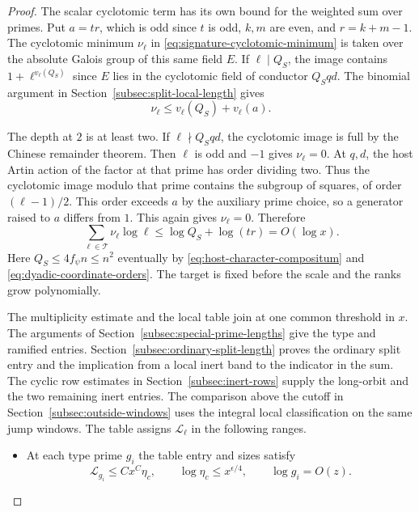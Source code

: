 \begin{proof}
The scalar cyclotomic term has its own bound for the weighted sum over primes.
Put \(a=tr\), which is odd since \(t\) is odd, \(k,m\)
are even, and \(r=k+m-1\). The cyclotomic minimum \(\nu_\ell\) in \eqref{eq:signature-cyclotomic-minimum}
is taken over the absolute Galois group of this same field \(E\). If \(\ell\mid Q_S\), the image
contains \(1+\ell^{v_\ell(Q_S)}\) since \(E\) lies in
the cyclotomic field of conductor \(Q_Sqd\). The
binomial argument in Section~\ref{subsec:split-local-length}
gives
\[
 \nu_\ell\le v_\ell(Q_S)+v_\ell(a).
\]

The depth at \(2\) is at least two. If
\(\ell\nmid Q_Sqd\), the cyclotomic image is full by
the Chinese remainder theorem. Then \(\ell\) is odd
and \(-1\) gives \(\nu_\ell=0\).
At \(q,d\), the host Artin action of the factor at
that prime has order dividing two. Thus the cyclotomic
image modulo that prime contains the subgroup of
squares, of order \((\ell-1)/2\). This order exceeds
\(a\) by the auxiliary prime choice, so a generator raised
to \(a\) differs from \(1\). This again gives
\(\nu_\ell=0\). Therefore
\[
 \sum_{\ell\in\mathcal T}\nu_\ell\log\ell
 \le \log Q_S + \log(tr)=O(\log x).
\]
Here \(Q_S\le4 f_\psi n\le n^2\) eventually by
\eqref{eq:host-character-compositum} and \eqref{eq:dyadic-coordinate-orders}.
The target is fixed before the scale and the ranks grow polynomially.

The multiplicity estimate and the local table join at
one common threshold in \(x\). The arguments of
Section~\ref{subsec:special-prime-lengths}
give the type and ramified entries. Section~\ref{subsec:ordinary-split-length}
proves the ordinary split entry and the implication from a local
inert band to the indicator in the sum. The cyclic row estimates
in Section~\ref{subsec:inert-rows} supply the long-orbit and
the two remaining inert entries. The comparison above the
cutoff in Section~\ref{subsec:outside-windows} uses the
integral local classification on the same jump windows. The table
assigns \(\mathcal L_\ell\) in the following ranges.

\begin{itemize}
\item At each type prime \(g_i\) the table entry and sizes satisfy
\[
 \mathcal L_{g_i}\le Cx^C\eta_c,\qquad \log\eta_c\le x^{\epsilon/4},\qquad \log g_i=O(z).
\]


\end{itemize}
\end{proof}

